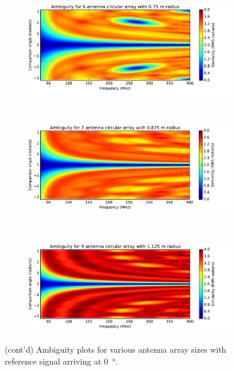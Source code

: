 \begin{figure}
  \ContinuedFloat
  \centering
  \begin{subfigure}{\textwidth}
    \centering
    \includegraphics[width=\textwidth, clip=true, trim = 0 15 53 0]{ambiguity06}
  \end{subfigure}\\[1em]
  \begin{subfigure}{\textwidth}
    \centering
    \includegraphics[width=\textwidth, clip=true, trim = 0 15 53 0]{ambiguity07}
  \end{subfigure}\\[1em]
  \begin{subfigure}{\textwidth}
    \centering
    \includegraphics[width=\textwidth, clip=true, trim = 0 15 53 0]{ambiguity09}
  \end{subfigure}
  \caption{(cont'd) Ambiguity plots for various antenna array sizes with reference signal arriving at \SI{0}{\degree}.}
\end{figure}

